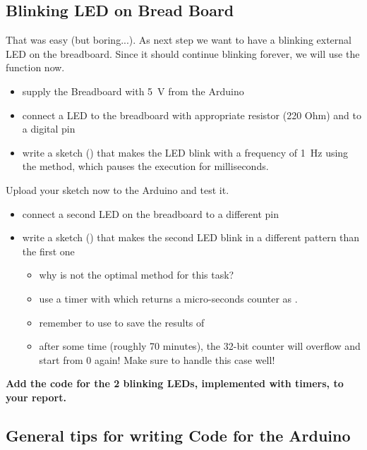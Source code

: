 \subsection{Blinking LED on Bread Board}\label{sec:led}
That was easy (but boring...). As next step we want to have a blinking external LED on the breadboard. Since it should continue blinking forever, we will use the  function now.
\begin{itemize}
	\item supply the Breadboard with \SI{5}{\volt} from the Arduino
	\item connect a LED to the breadboard with appropriate resistor (220 Ohm) and to a digital pin
	\item write a sketch () that makes the LED blink with a frequency of \SI{1}{\hertz} using the  method, which pauses the execution for  milliseconds.
\end{itemize}
Upload your sketch now to the Arduino and test it.

\begin{itemize}
	\item connect a second LED on the breadboard to a different pin
	\item write a sketch () that makes the second LED blink in a different pattern than the first one
	\begin{itemize}
		\item why is  not the optimal method for this task?
		\item use a timer with  which returns a micro-seconds counter as .
		\item remember to use   to save the results of 
		\item after some time (roughly 70 minutes), the 32-bit counter will overflow and start from 0 again! Make sure to handle this case well!
	\end{itemize}
\end{itemize}

\textbf{Add the code for the 2 blinking LEDs, implemented with timers, to your report.}



\subsection{General tips for writing Code for the Arduino}\label{sec:codestyle}

